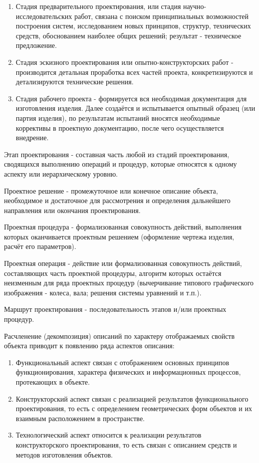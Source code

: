 \documentclass[unicode, 12pt, a4paper, oneside]{article}
\begin{document}
\begin{enumerate}
\item Стадия предварительного проектирования, или стадия научно-исследовательских работ, связана с поиском принципиальных возможностей построения систем, исследованием новых принципов, структур, технических средств, обоснованием наиболее общих решений; результат - техническое предложение.
\item Стадия эскизного проектирования или опытно-конструкторских работ - производится детальная проработка всех частей проекта, конкретизируются и детализируются  технические решения. 
\item Стадия рабочего проекта - формируется вся необходимая документация для изготовления изделия. Далее создаётся и испытывается опытный образец (или партия изделия), по результатам испытаний вносятся необходимые коррективы в проектную документацию, после чего осуществляется внедрение. 
\end{enumerate}
 
Этап проектирования - составная часть любой из стадий  проектирования, сводящихся выполнению операций и процедур, которые относятся к одному аспекту или иерархическому уровню. 

Проектное решение - промежуточное или конечное описание объекта, необходимое и достаточное для рассмотрения и определения дальнейшего направления или окончания проектирования. 

Проектная процедура - формализованная совокупность действий, выполнения которых оканчивается проектным решением (оформление чертежа изделия, расчёт его параметров). 

Проектная операция - действие или формализованная совокупность действий, составляющих часть проектной процедуры, алгоритм которых остаётся неизменным для ряда проектных процедур (вычерчивание типового графического изображения - колеса, вала; решения системы уравнений и т.п.). 

Маршрут  проектирования - последовательность этапов и/или проектных процедур. 

Расчленение (декомпозиция) описаний по характеру отображаемых свойств объекта приводит к появлению ряда аспектов описания:

\begin{enumerate}
\item Функциональный аспект связан с отображением основных принципов функционирования, характера физических и информационных процессов, протекающих в объекте. 
\item Конструкторский аспект связан с реализацией результатов функционального проектирования, то есть с определением геометрических форм объектов и их взаимным расположением в пространстве. 
\item Технологический аспект относится к реализации результатов конструкторского проектирования, то есть связан с описанием средств и методов изготовления объектов.
\end{enumerate}
 
\end{document}
